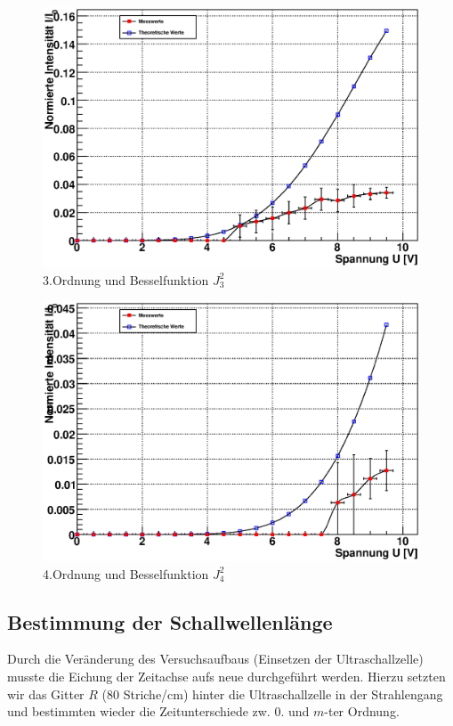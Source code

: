 \documentclass[12pt]{article}
\begin{document}
\begin{figure}[H]  
\centering
\includegraphics[width=0.9\linewidth]{pictures/raman3o.eps}
\caption{3.Ordnung und Besselfunktion $J^2_3$}
\end{figure}

\begin{figure}[H]  
\centering
\includegraphics[width=0.9\linewidth]{pictures/raman4o.eps}
\caption{4.Ordnung und Besselfunktion $J^2_4$}
\end{figure}


\subsection{Bestimmung der Schallwellenlänge}
Durch die Veränderung des Versuchsaufbaus (Einsetzen der Ultraschallzelle) musste die Eichung der Zeitachse aufs neue durchgeführt werden.
Hierzu setzten wir das Gitter $R$ (80 Striche/cm) hinter die Ultraschallzelle in der Strahlengang und bestimmten wieder
die Zeitunterschiede zw. 0. und $m$-ter Ordnung.
\end{document}
